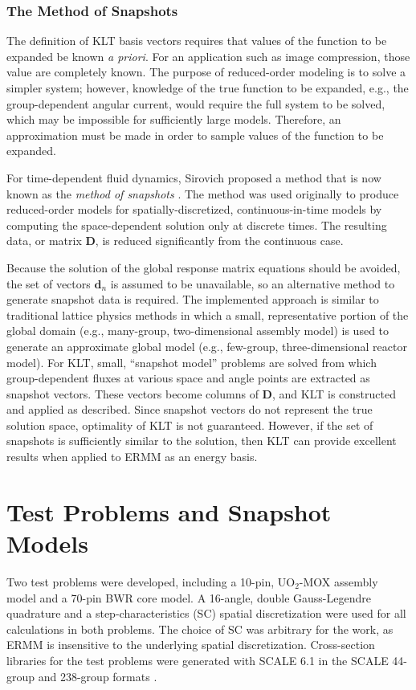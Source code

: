 \documentclass[5p,times,twocolumn,10pt]{elsarticle}
\begin{document}
    \subsubsection{The Method of Snapshots}
    
    
    The definition of KLT basis vectors requires that values of the function to 
    be expanded be known {\it a priori}.  For an application such as image 
    compression, those value are completely known.  The purpose of 
    reduced-order modeling is to solve a simpler system; however, knowledge of 
    the true function to be expanded, e.g., the group-dependent angular 
    current, would require the full system to be solved, which may be 
    impossible for sufficiently large models. Therefore, an approximation must 
    be made in order to sample values of the function to be expanded.  
    
    For  time-dependent fluid dynamics, Sirovich proposed a method 
    \cite{Sirovich1987} that is now known as the {\it method of snapshots} 
    \cite{Buchan2013}. The method was used originally to produce reduced-order 
    models for spatially-discretized, continuous-in-time models by computing 
    the space-dependent solution only at discrete times. The resulting data, or 
    matrix $\mathbf{D}$, is reduced significantly from the continuous case.
    
    Because the solution of the global response matrix equations should be 
    avoided, 
    the set of vectors $\mathbf{d}_n$ is assumed to be unavailable, so
    an alternative method to generate snapshot data is required. The implemented
    approach is similar to traditional lattice physics methods in which 
    a small, representative portion of the global domain (e.g., many-group, 
    two-dimensional assembly model) is used to generate 
    an approximate global model (e.g., few-group, three-dimensional
    reactor model).  For KLT, small, ``snapshot model'' problems 
    are solved from which group-dependent fluxes at various space and angle 
    points are extracted as snapshot vectors.  These vectors become 
    columns of $\mathbf{D}$, and KLT is constructed and applied as
    described.  Since snapshot vectors do not represent the 
    true solution space, optimality of KLT is not guaranteed.
    However, if the set of snapshots is sufficiently similar to the 
    solution, then KLT can provide excellent results when applied
    to ERMM as an energy basis. 
    
    \section{Test Problems and Snapshot Models}
    \label{sec:testproblems}
    Two test problems were developed, including a 10-pin, UO$_2$-MOX assembly 
    model and a 70-pin BWR core model. A 16-angle, double Gauss-Legendre 
    quadrature and a step-characteristics (SC) spatial discretization were used 
    for all calculations in both problems.  The choice of SC was arbitrary for 
    the work, as ERMM is insensitive to the underlying spatial discretization.
    Cross-section libraries for the test problems were generated with SCALE 6.1 
    in the SCALE 44-group and 238-group formats \cite{Scale}.
    
\end{document}
